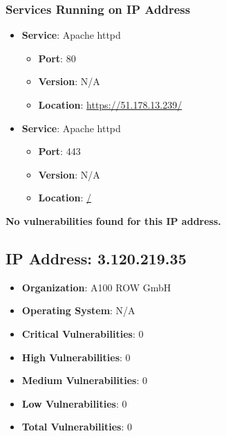 \documentclass{article}
\begin{document}
\subsubsection*{Services Running on IP Address}

\begin{itemize}
    
        \item \textbf{Service}: Apache httpd
        \begin{itemize}
            \item \textbf{Port}: 80
            \item \textbf{Version}:  N/A 
            \item \textbf{Location}: \href{ https://51.178.13.239/ }{ https://51.178.13.239/ }
        \end{itemize}
    
        \item \textbf{Service}: Apache httpd
        \begin{itemize}
            \item \textbf{Port}: 443
            \item \textbf{Version}:  N/A 
            \item \textbf{Location}: \href{ / }{ / }
        \end{itemize}
    
\end{itemize}


\textbf{No vulnerabilities found for this IP address.}




\clearpage



\subsection{IP Address: 3.120.219.35}

\begin{itemize}
    \item \textbf{Organization}: A100 ROW GmbH
    \item \textbf{Operating System}:  N/A 
    \item \textbf{Critical Vulnerabilities}: 0
    \item \textbf{High Vulnerabilities}: 0
    \item \textbf{Medium Vulnerabilities}: 0
    \item \textbf{Low Vulnerabilities}: 0
    \item \textbf{Total Vulnerabilities}: 0
\end{itemize}
\end{document}
